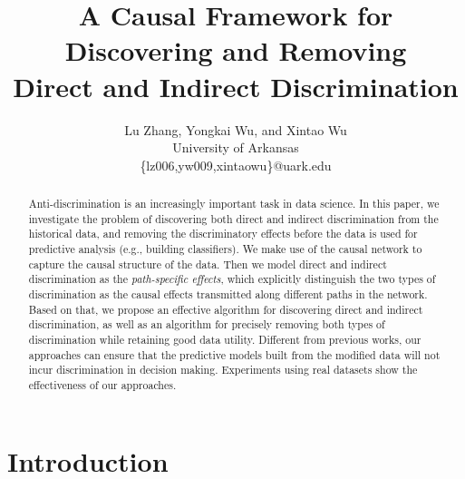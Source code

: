 \documentclass[letterpaper]{article}
\begin{document}
%
\title{A Causal Framework for Discovering and Removing \\ Direct and Indirect Discrimination}
\author{Lu Zhang, Yongkai Wu, and Xintao Wu\\
University of Arkansas\\
\{lz006,yw009,xintaowu\}@uark.edu}
\maketitle
\begin{abstract}
Anti-discrimination is an increasingly important task in data science. 
In this paper, we investigate the problem of discovering both direct and indirect discrimination from the historical data, and removing the discriminatory effects before the data is used for predictive analysis (e.g., building classifiers). We make use of the causal network to capture the causal structure of the data. Then we model direct and indirect discrimination as the \emph{path-specific effects}, which explicitly distinguish the two types of discrimination as the causal effects transmitted along different paths in the network. Based on that, we propose an effective algorithm for discovering direct and indirect discrimination, as well as an algorithm for precisely removing both types of discrimination while retaining good data utility. Different from previous works, our approaches can ensure that the predictive models built from the modified data will not incur discrimination in decision making. Experiments using real datasets show the effectiveness of our approaches.
\end{abstract}

\section{Introduction}
\end{document}
